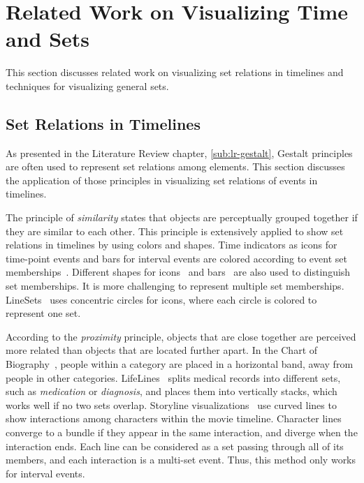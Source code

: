 \section{Related Work on Visualizing Time and Sets}
\label{sub:ts-review}

This section discusses related work on visualizing set relations in timelines and techniques for visualizing general sets.

\subsection{Set Relations in Timelines}
As presented in the Literature Review chapter, \autoref{sub:lr-gestalt}, Gestalt principles are often used to represent set relations among elements. This section discusses the application of those principles in visualizing set relations of events in timelines.

The principle of \textit{similarity} states that objects are perceptually grouped together if they are similar to each other. This principle is extensively applied to show set relations in timelines by using colors and shapes. Time indicators as icons for time-point events and bars for interval events are colored according to event set memberships~\cite{SimileTimeline2009,Wang2008}. Different shapes for icons~\cite{TimeGlider2016} and bars~\cite{Plaisant1998} are also used to distinguish set memberships. It is more challenging to represent multiple set memberships. LineSets~\cite{Alper2011} uses concentric circles for icons, where each circle is colored to represent one set.

According to the \textit{proximity} principle, objects that are close together are perceived more related than objects that are located further apart. In the Chart of Biography~\cite{Priestley1765}, people within a category are placed in a horizontal band, away from people in other categories. LifeLines~\cite{Plaisant1998} splits medical records into different sets, such as \textit{medication} or \textit{diagnosis}, and places them into vertically stacks, which works well if no two sets overlap. Storyline visualizations~\cite{Tanahashi2012,Liu2013} use curved lines to show interactions among characters within the movie timeline. Character lines converge to a bundle if they appear in the same interaction, and diverge when the interaction ends. Each line can be considered as a set passing through all of its members, and each interaction is a multi-set event. Thus, this method only works for interval events.

